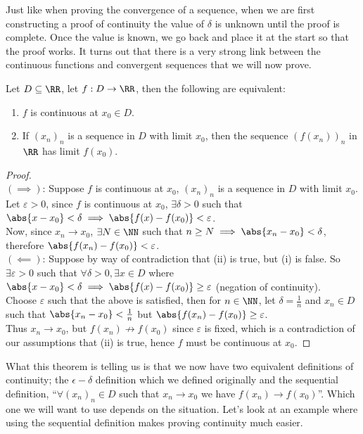 \documentclass[../real_analysis.tex]{subfiles}
\begin{document}
        Just like when proving the convergence of a sequence, when we are first constructing a proof of continuity the value of $\delta$ is unknown until the proof is complete. Once the value is known, we go back and place it at the start so that the proof works.
        It turns out that there is a very strong link between the continuous functions and convergent sequences that we will now prove.
        \begin{theorem}\label{seq-cont}
            Let $D\subseteq\RR$, let $f: D\to\RR$, then the following are equivalent:
            \begin{enumerate}[label={\upshape(\roman*)}]
                \item $f$ is continuous at $x_0\in D$.
                \item If $(x_n)_n$ is a sequence in $D$ with limit $x_0$, then the sequence $(f(x_n))_n$ in $\RR$ has limit $f(x_0)$.
            \end{enumerate}
        \end{theorem}
        \begin{proof}\\
            $(\implies)$: Suppose $f$ is continuous at $x_0$, $(x_n)_n$ is a sequence in $D$ with limit $x_0$.\\
            Let $\varepsilon>0$, since $f$ is continuous at $x_0$, $\exists\delta>0$ such that $\abs{x-x_0}<\delta\implies\abs{f(x)-f(x_0)}<\varepsilon$.\\
            Now, since $x_n\to x_0$, $\exists N\in\NN$ such that $n\geq N\implies\abs{x_n-x_0}<\delta$, therefore $\abs{f(x_n)-f(x_0)}<\varepsilon$.\\
            $(\impliedby)$: Suppose by way of contradiction that (ii) is true, but (i) is false. So $\exists\varepsilon>0$ such that $\forall\delta>0, \exists x\in D$ where $\abs{x-x_0}<\delta\implies\abs{f(x)-f(x_0)}\geq\varepsilon$ (negation of continuity).\\
            Choose $\varepsilon$ such that the above is satisfied, then for $n\in\NN$, let $\delta=\frac{1}{n}$ and $x_n\in D$ such that $\abs{x_n-x_0}<\frac{1}{n}$ but $\abs{f(x_n)-f(x_0)}\geq\varepsilon$.\\
            Thus $x_n\to x_0$, but $f(x_n)\not\to f(x_0)$ since $\varepsilon$ is fixed, which is a contradiction of our assumptions that (ii) is true, hence $f$ must be continuous at $x_0$.
        \end{proof}
        What this theorem is telling us is that we now have two equivalent definitions of continuity; the $\epsilon-\delta$ definition which we defined originally and the sequential definition, ``$\forall(x_n)_n\in D$ such that $x_n\to x_0$ we have $f(x_n)\to f(x_0)$''. Which one we will want to use depends on the situation. Let's look at an example where using the sequential definition makes proving continuity much easier.
\end{document}
